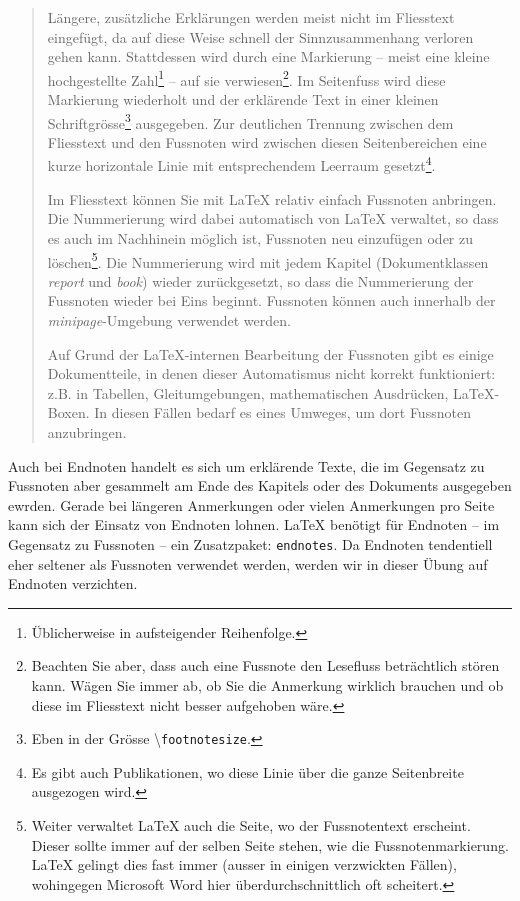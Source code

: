 \documentclass[11pt, a4paper,draft]{article}
\newcommand{\ltx}{\LaTeX}
\let\oldmarginpar\marginpar
\renewcommand{\marginpar}[1]{\oldmarginpar{\textit{#1}}}
\begin{document}
\begin{quote}
Längere, zusätzliche Erklärungen werden meist nicht im Fliesstext eingefügt, da auf diese Weise schnell der Sinnzusammenhang verloren gehen kann. Stattdessen wird durch eine Markierung -- meist eine kleine hochgestellte Zahl\footnote{Üblicherweise in aufsteigender Reihenfolge.} -- auf sie verwiesen\footnote{Beachten Sie aber, dass auch eine Fussnote den Lesefluss beträchtlich stören kann. Wägen Sie immer ab, ob Sie die Anmerkung wirklich brauchen und ob diese im Fliesstext nicht besser aufgehoben wäre.}. Im Seitenfuss wird diese Markierung wiederholt und der erklärende Text in einer kleinen Schriftgrösse\footnote{Eben in der Grösse \textbackslash\texttt{footnotesize}.} ausgegeben. Zur deutlichen Trennung zwischen dem Fliesstext und den Fussnoten wird zwischen diesen Seitenbereichen eine kurze horizontale Linie mit entsprechendem Leerraum gesetzt\footnote{Es gibt auch Publikationen, wo diese Linie über die ganze Seitenbreite ausgezogen wird.}.

Im Fliesstext können Sie mit \ltx{} relativ einfach Fussnoten anbringen. Die Nummerierung wird dabei automatisch von \ltx{} verwaltet, so dass es auch im Nachhinein möglich ist, Fussnoten neu einzufügen oder zu löschen\footnote{Weiter verwaltet \ltx{} auch die Seite, wo der Fussnotentext erscheint. Dieser sollte immer auf der selben Seite stehen, wie die Fussnotenmarkierung. \ltx{} gelingt dies fast immer (ausser in einigen verzwickten Fällen), wohingegen Microsoft Word hier überdurchschnittlich oft scheitert.}. Die Nummerierung wird mit jedem Kapitel (Dokumentklassen \textit{report} und \textit{book}) wieder zurückgesetzt, so dass die Nummerierung der Fussnoten wieder bei Eins beginnt. Fussnoten können auch innerhalb der \textit{minipage}-Umgebung verwendet werden.

Auf Grund der \ltx-internen Bearbeitung der Fussnoten gibt es einige Dokumentteile, in denen dieser Automatismus nicht korrekt funktioniert: z.B. in Tabellen, Gleitumgebungen, mathematischen Ausdrücken, \ltx-Boxen. In diesen Fällen bedarf es eines Umweges, um dort Fussnoten anzubringen.
\end{quote}

Auch bei Endnoten\marginpar{Endnoten} handelt es sich um erklärende Texte, die im Gegensatz zu Fussnoten aber gesammelt am Ende des Kapitels oder des Dokuments ausgegeben ewrden. Gerade bei längeren Anmerkungen oder vielen Anmerkungen pro Seite kann sich der Einsatz von Endnoten lohnen. \ltx{} benötigt für Endnoten \parencite{lkgt} -- im Gegensatz zu Fussnoten -- ein Zusatzpaket: \texttt{endnotes}. Da Endnoten tendentiell eher seltener als Fussnoten verwendet werden, werden wir in dieser Übung auf Endnoten verzichten.
\end{document}
